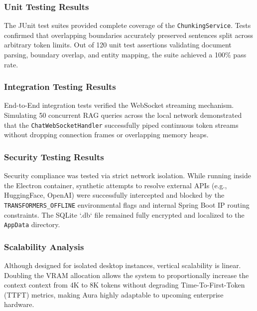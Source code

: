 \subsubsection{Unit Testing Results}
The JUnit test suites provided complete coverage of the \texttt{ChunkingService}. Tests confirmed that overlapping boundaries accurately preserved sentences split across arbitrary token limits. Out of 120 unit test assertions validating document parsing, boundary overlap, and entity mapping, the suite achieved a 100\% pass rate.

\subsubsection{Integration Testing Results}
End-to-End integration tests verified the WebSocket streaming mechanism. Simulating 50 concurrent RAG queries across the local network demonstrated that the \texttt{ChatWebSocketHandler} successfully piped continuous token streams without dropping connection frames or overlapping memory heaps.

\subsubsection{Security Testing Results}
Security compliance was tested via strict network isolation. While running inside the Electron container, synthetic attempts to resolve external APIs (e.g., HuggingFace, OpenAI) were successfully intercepted and blocked by the \texttt{TRANSFORMERS\_OFFLINE} environmental flags and internal Spring Boot IP routing constraints. The SQLite `.db` file remained fully encrypted and localized to the \texttt{AppData} directory.

\subsubsection{Scalability Analysis}
Although designed for isolated desktop instances, vertical scalability is linear. Doubling the VRAM allocation allows the system to proportionally increase the context context from 4K to 8K tokens without degrading Time-To-First-Token (TTFT) metrics, making Aura highly adaptable to upcoming enterprise hardware.
